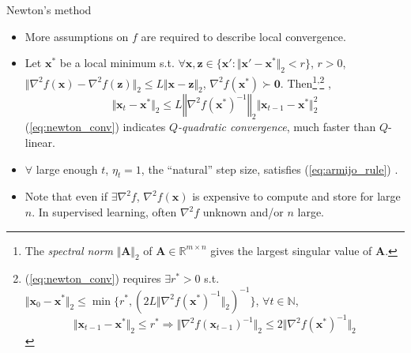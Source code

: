 \documentclass{beamer}
\numberwithin{equation}{section}
\newcommand{\aref}[1]{\alert{\ref{#1}}}
\begin{document}
\begin{frame}{Newton's method}
    \begin{itemize}
        \item
        More assumptions on $ f $ are required to describe local convergence.

        \item
        Let $ \mathbf{x}^* $ be a local minimum s.t. $ \forall \mathbf{x},
        \mathbf{z} \in \{\mathbf{x}' :
        \Vert\mathbf{x}' - \mathbf{x}^*\Vert_2 < r\} $, $ r > 0 $,
        $ \Vert\nabla^2f(\mathbf{x}) - \nabla^2f(\mathbf{z})\Vert_2 \le
        L\Vert\mathbf{x} - \mathbf{z}\Vert_2 $, $ \nabla^2f(\mathbf{x}^*)
        \succ \mathbf{0} $. Then\footnote{
            The \textit{spectral norm} $ \Vert\mathbf{A}\Vert_2 $ of
            $ \mathbf{A} \in \mathbb{R}^{m \times n} $ gives the largest
            singular value of $ \mathbf{A} $.
        }\textsuperscript{,}\footnote{
            (\aref{eq:newton_conv}) requires $ \exists r^* > 0 $ s.t.
            $ \Vert\mathbf{x}_0  - \mathbf{x}^*\Vert_2 \le \min\big\{r^*,
            (2L\Vert\nabla^2f(\mathbf{x}^*)^{-1}\Vert_2)^{-1}\big\} $,
            $ \forall t \in \mathbb{N} $,
            \begin{equation*}
                \Vert\mathbf{x}_{t - 1} - \mathbf{x}^*\Vert_2 \le r^*
                \Rightarrow
                \big\Vert\nabla^2f(\mathbf{x}_{t - 1})^{-1}\big\Vert_2 \le
                2\big\Vert\nabla^2f(\mathbf{x}^*)^{-1}\big\Vert_2
            \end{equation*}
            \vspace{-10 pt}
        } \cite{nocedal_opt},
        \begin{equation} \label{eq:newton_conv}
            \Vert\mathbf{x}_t - \mathbf{x}^*\Vert_2 \le
            L\left\Vert\nabla^2f(\mathbf{x}^*)^{-1}\right\Vert_2
            \Vert\mathbf{x}_{t - 1} - \mathbf{x}^*\Vert_2^2
        \end{equation}
        (\aref{eq:newton_conv}) indicates $ Q $\textit{-quadratic convergence},
        much faster than $ Q $-linear.

        \item
        $ \forall $ large enough $ t $, $ \eta_t = 1 $, the ``natural'' step
        size, satisfies (\aref{eq:armijo_rule}) \cite{nocedal_opt}.

        \item
        Note that even if $ \exists \nabla^2 f $, $ \nabla^2f(\mathbf{x}) $ is
        expensive to compute and store for large $ n $. In supervised learning,
        often $ \nabla^2 f $ unknown and/or $ n $ large.
    \end{itemize}

    \medskip
\end{frame}
\end{document}
